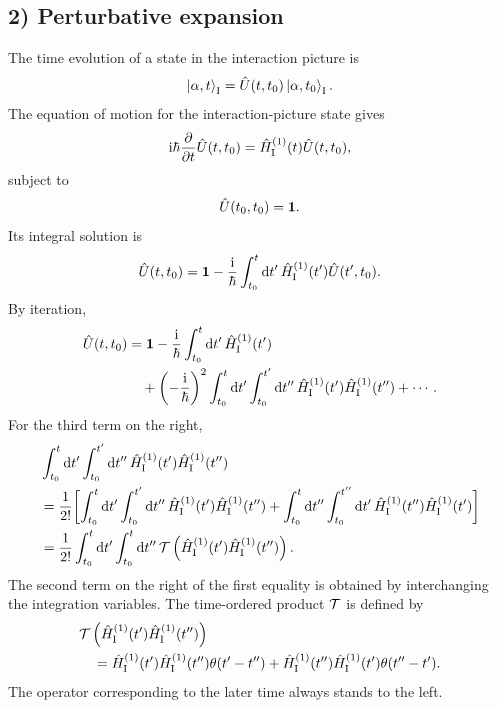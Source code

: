 \subsection*{2) Perturbative expansion}
The time evolution of a state in the interaction picture is
\begin{equation}
 \left|\alpha,t\right\rangle_{\mathrm I}
 =\hat{U}(t,t_0)\left|\alpha,t_0\right\rangle_{\mathrm I}.
\end{equation}
The equation of motion for the interaction-picture state gives
\begin{equation}
 \mathrm{i}\hbar\frac{\partial}{\partial t}\hat{U}(t,t_0)
 =\hat{H}^{(1)}_{\mathrm I}(t)\hat{U}(t,t_0),
\end{equation}
subject to
\begin{equation}
 \hat{U}(t_0,t_0)=\mathbf1.
\end{equation}
Its integral solution is
\begin{equation}
 \hat{U}(t,t_0)=\mathbf1-\frac{\mathrm{i}}{\hbar}
 \int_{t_0}^{t}\mathrm{d} t'\,\hat{H}^{(1)}_{\mathrm I}(t')\hat{U}(t',t_0).
\end{equation}
By iteration,
\begin{equation}\begin{aligned}
 \hat{U}(t,t_0)
 &=\mathbf1-\frac{\mathrm{i}}{\hbar}\int_{t_0}^{t}\mathrm{d} t'\,
 \hat{H}^{(1)}_{\mathrm I}(t')\\
 &\quad+\left(-\frac{\mathrm{i}}{\hbar}\right)^2
 \int_{t_0}^{t}\mathrm{d} t'\int_{t_0}^{t'}\mathrm{d} t''\,
 \hat{H}^{(1)}_{\mathrm I}(t')\hat{H}^{(1)}_{\mathrm I}(t'')+\cdots.
\end{aligned}\end{equation}
For the third term on the right,
\begin{equation}\begin{aligned}
 &\int_{t_0}^{t}\mathrm{d} t'\int_{t_0}^{t'}\mathrm{d} t''\,
 \hat{H}^{(1)}_{\mathrm I}(t')\hat{H}^{(1)}_{\mathrm I}(t'')\\
 &=\frac1{2!}\biggl[
 \int_{t_0}^{t}\mathrm{d} t'\int_{t_0}^{t'}\mathrm{d} t''\,
 \hat{H}^{(1)}_{\mathrm I}(t')\hat{H}^{(1)}_{\mathrm I}(t'')
 +\int_{t_0}^{t}\mathrm{d} t''\int_{t_0}^{t''}\mathrm{d} t'\,
 \hat{H}^{(1)}_{\mathrm I}(t'')\hat{H}^{(1)}_{\mathrm I}(t')
 \biggr]\\
 &=\frac1{2!}\int_{t_0}^{t}\mathrm{d} t'\int_{t_0}^{t}\mathrm{d} t''\,
 \mathcal{T}\left(\hat{H}^{(1)}_{\mathrm I}(t')\hat{H}^{(1)}_{\mathrm I}(t'')\right).
\end{aligned}\end{equation}
The second term on the right of the first equality is obtained by interchanging the integration variables. The time-ordered product $\mathcal{T}$ is defined by
\begin{equation}\begin{aligned}
 &\mathcal{T}\left(\hat{H}^{(1)}_{\mathrm I}(t')\hat{H}^{(1)}_{\mathrm I}(t'')\right)\\
 &\quad=\hat{H}^{(1)}_{\mathrm I}(t')\hat{H}^{(1)}_{\mathrm I}(t'')\theta(t'-t'')
 +\hat{H}^{(1)}_{\mathrm I}(t'')\hat{H}^{(1)}_{\mathrm I}(t')\theta(t''-t').
\end{aligned}\end{equation}
The operator corresponding to the later time always stands to the left.

